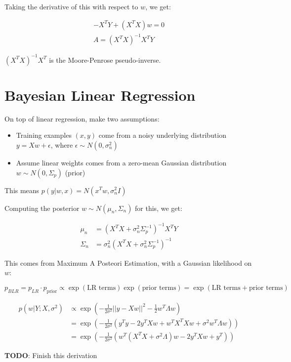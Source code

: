 \documentclass[a4paper]{article}
\begin{document}
Taking the derivative of this with respect to $w$, we get:

\begin{align*}
-X^T Y + (X^T X)w = 0 \\
A = (X^T X)^{-1} X^T Y
\end{align*}

$(X^T X)^{-1} X^T$ is the Moore-Penrose pseudo-inverse. 

\section{Bayesian Linear Regression}

On top of linear regression, make two assumptions: 

\begin{itemize}
	\item Training examples $(x,y)$ come from a noisy underlying distribution $y=Xw + \epsilon$, where $\epsilon \sim N(0, \sigma_n^2)$
	\item Assume linear weights comes from a zero-mean Gaussian distribution $w \sim N(0, \Sigma_p)$ (prior)
\end{itemize}

This means $p(y | w, x)=N(x^T w, \sigma_n^2 I)$

Computing the posterior $w \sim N(\mu_n, \Sigma_n)$ for this, we get:

\begin{align*}
\mu_n &= (X^T X + \sigma_n^2 \Sigma_p^{-1})^{-1} X^T Y \\
\Sigma_n &= \sigma_n^2 (X^T X + \sigma_n^2 \Sigma_p^{-1})^{-1}
\end{align*}

This comes from Maximum A Posteori Estimation, with a Gaussian likelihood on $w$:

$$p_{BLR} = p_{LR} \cdot p_{\text{prior}} \propto \exp(\text{LR terms}) \exp(\text{prior terms}) = \exp(\text{LR terms}+\text{prior terms})$$

\begin{align*}
p(w|Y; X, \sigma^2) &\propto \exp \left(-\frac{1}{2\sigma^2} ||y-Xw||^2 - \frac{1}{2} w^T \Lambda w \right) \\
&= \exp \left(-\frac{1}{2\sigma^2} (y^T y - 2y^T X w + w^T X^T X w + \sigma^2 w^T \Lambda w) \right) \\
&= \exp \left(-\frac{1}{2\sigma^2} (w^T(X^TX + \sigma^2 \Lambda)w -2 y^T Xw + y^T) \right)
\end{align*}

\textbf{TODO}: Finish this derivation
\end{document}
